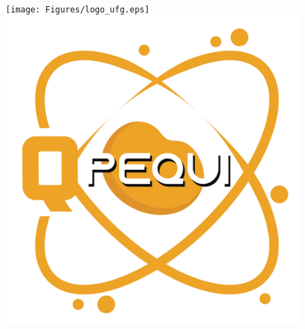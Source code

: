 \documentclass[
12pt, english,
onehalfspacing, %
nolistspacing, %
liststotoc, %
headsepline, %
consistentlayout, %
]{Thesis} %
\author{Jane/John \textsc{Doe}} %
\begin{document}
\pagestyle{plain} %


\begin{figure}[t!]
\centering
\texttt{[image: Figures/logo\_ufg.eps]} \hspace{5cm} \includegraphics[scale=0.05]{Figures/logo_qpequi.png}
\end{figure}

\vspace{2cm}
\end{document}

